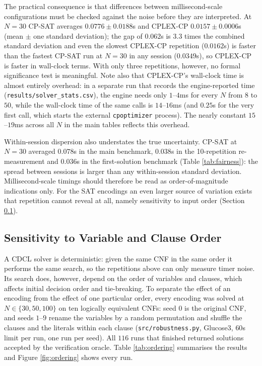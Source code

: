 \documentclass[a4paper,fleqn]{cas-sc}
\begin{document}
The practical consequence is that differences between millisecond-scale configurations must be checked against the noise before they are interpreted. At $N=30$ CP-SAT averages $0.0776 \pm 0.0188$s and CPLEX-CP $0.0157 \pm 0.0006$s (mean $\pm$ one standard deviation); the gap of $0.062$s is $3.3$ times the combined standard deviation and even the slowest CPLEX-CP repetition ($0.0162$s) is faster than the fastest CP-SAT run at $N=30$ in any session ($0.0349$s), so CPLEX-CP is faster in wall-clock terms. With only three repetitions, however, no formal significance test is meaningful. Note also that CPLEX-CP's wall-clock time is almost entirely overhead: in a separate run that records the engine-reported time (\texttt{results/solver\_stats.csv}), the engine needs only $1$--$4$ms for every $N$ from $8$ to $50$, while the wall-clock time of the same calls is $14$--$16$ms (and $0.25$s for the very first call, which starts the external \texttt{cpoptimizer} process). The nearly constant $15$--$19$ms across all $N$ in the main tables reflects this overhead.

Within-session dispersion also understates the true uncertainty. CP-SAT at $N=30$ averaged $0.078$s in the main benchmark, $0.038$s in the 10-repetition re-measurement and $0.036$s in the first-solution benchmark (Table \ref{tab:fairness}): the spread between sessions is larger than any within-session standard deviation. Millisecond-scale timings should therefore be read as order-of-magnitude indications only. For the SAT encodings an even larger source of variation exists that repetition cannot reveal at all, namely sensitivity to input order (Section \ref{sec:ordering}).

\subsection{Sensitivity to Variable and Clause Order}
\label{sec:ordering}
A CDCL solver is deterministic: given the same CNF in the same order it performs the same search, so the repetitions above can only measure timer noise. Its search does, however, depend on the order of variables and clauses, which affects initial decision order and tie-breaking. To separate the effect of an encoding from the effect of one particular order, every encoding was solved at $N \in \{30, 50, 100\}$ on ten logically equivalent CNFs: seed $0$ is the original CNF, and seeds $1$--$9$ rename the variables by a random permutation and shuffle the clauses and the literals within each clause (\texttt{src/robustness.py}, Glucose3, $60$s limit per run, one run per seed). All $116$ runs that finished returned solutions accepted by the verification oracle. Table \ref{tab:ordering} summarises the results and Figure \ref{fig:ordering} shows every run.
\end{document}
